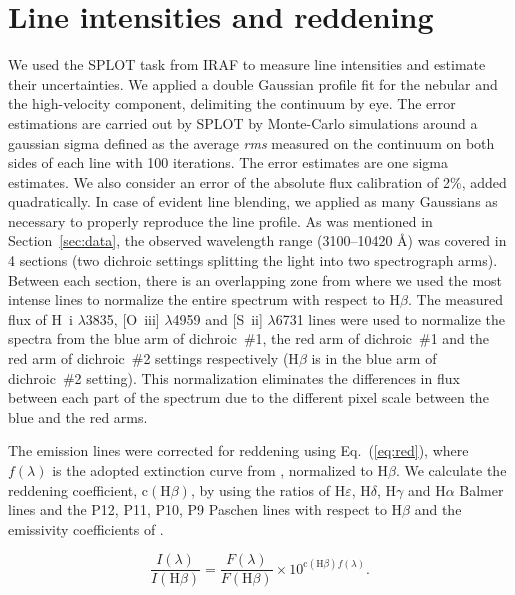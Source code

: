 \documentclass[fleqn,usenatbib]{mnras}
\begin{document}
\section{Line intensities and reddening}
\label{sec:line_inten}


We used the SPLOT task from IRAF to measure line intensities and estimate their uncertainties. We applied a double Gaussian profile fit for the nebular and the high-velocity component, delimiting the continuum by eye. The error estimations are carried out by SPLOT by Monte-Carlo simulations around a gaussian sigma defined as the average {\it rms} measured on the continuum on both sides of each line with 100 iterations. The error estimates are one sigma estimates. 
We also consider an error of the absolute flux calibration of 2\%, added quadratically. In case of evident line blending, we applied as many Gaussians as necessary to properly reproduce the line profile. As was mentioned in Section~\ref{sec:data}, the observed wavelength range (3100--10420 \AA) was covered in 4 sections (two dichroic settings splitting the light into two spectrograph arms). Between each section, there is an overlapping zone from where we used the most intense lines to normalize the entire spectrum with respect to  H$\beta$. The measured flux of H~{\sc i} $\lambda$3835, [O~{\sc iii}] $\lambda$4959 and [S~{\sc ii}] $\lambda$6731 lines were used to normalize the spectra from the blue arm of dichroic~\#1, the red arm of dichroic~\#1 and the red arm of dichroic~\#2 settings respectively (H$\beta$ is in the blue arm of dichroic~\#2 setting). This normalization eliminates the differences in flux between each part of the spectrum due to the different pixel scale between the blue and the red arms. 

The emission lines were corrected for reddening using Eq.~(\ref{eq:red}), where $f(\lambda)$ is the adopted extinction curve from \citet{Blagrave07}, normalized to $\text{H}\beta$. We calculate the reddening coefficient, $\text{c}(\text{H}\beta)$, by using the ratios of $\text{H}\varepsilon$, $\text{H}\delta$, $\text{H}\gamma$ and $\text{H}\alpha$ Balmer lines and the P12, P11, P10, P9 Paschen lines with respect to $\text{H}\beta$ and the emissivity coefficients of \citet{Storey95}.

\begin{equation}
\label{eq:red}
\frac{I(\lambda)}{I(\text{H}\beta)}=\frac{F(\lambda)}{F(\text{H}\beta)} \times 10^{\text{c}(\text{H}\beta) f(\lambda)}.
\end{equation}
\end{document}

